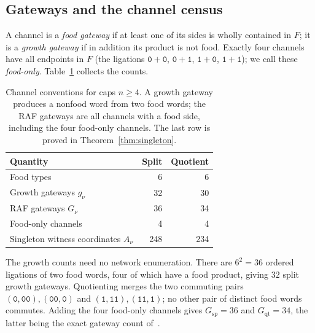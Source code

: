 \documentclass[11pt,a4paper]{article}
\theoremstyle{plain}
\theoremstyle{definition}
\theoremstyle{remark}
\newcommand{\qt}{\mathrm{qt}}
\newcommand{\spc}{\mathrm{sp}}
\newcommand{\word}[1]{\mathtt{#1}}
\begin{document}
\subsection{Gateways and the channel census}
A channel is a \emph{food gateway} if at least one of its sides is wholly contained in $F$; it is a \emph{growth gateway} if in addition its product is not food. Exactly four channels have all endpoints in $F$ (the ligations $\word0+\word0$, $\word0+\word1$, $\word1+\word0$, $\word1+\word1$); we call these \emph{food-only}. Table~\ref{tab:model} collects the counts.

\begin{table}[t]
\centering
\caption{Channel conventions for caps $n\ge4$. A growth gateway produces a nonfood word from two food words; the RAF gateways are all channels with a food side, including the four food-only channels. The last row is proved in Theorem~\ref{thm:singleton}.}
\label{tab:model}
\begin{tabular}{lrr}\toprule
Quantity & Split & Quotient\\\midrule
Food types & 6 & 6\\
Growth gateways $g_\nu$ & 32 & 30\\
RAF gateways $G_\nu$ & 36 & 34\\
Food-only channels & 4 & 4\\
Singleton witness coordinates $A_\nu$ & 248 & 234\\\bottomrule
\end{tabular}
\end{table}

The growth counts need no network enumeration. There are $6^2=36$ ordered ligations of two food words, four of which have a food product, giving $32$ split growth gateways. Quotienting merges the two commuting pairs $(\word0,\word{00}),(\word{00},\word0)$ and $(\word1,\word{11}),(\word{11},\word1)$; no other pair of distinct food words commutes. Adding the four food-only channels gives $G_{\spc}=36$ and $G_{\qt}=34$, the latter being the exact gateway count of~\cite{overlapgateway2026}.
\end{document}
